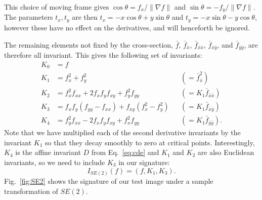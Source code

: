 \documentclass[review,onefignum,onetabnum]{siamonline190516}
\begin{document}
This choice of moving frame gives $\cos\theta = f_x/\lVert\nabla f\rVert$
and $\sin\theta = -f_y/\lVert \nabla f \rVert$. The parameters $t_x, t_y$
are then $t_x = -x\cos\theta + y\sin\theta$ and $t_y = -x\sin\theta -
y\cos\theta$, however these have no effect on the derivatives, and will
henceforth be ignored.

The remaining elements not fixed by the cross-section, $\bar{f}$,
$\bar{f}_{\bar{x}}$, $\bar{f}_{\bar{x}\bar{x}}$,
$\bar{f}_{\bar{x}\bar{y}}$, and $\bar{f}_{\bar{y}\bar{y}}$, are therefore
all invariant. This gives the following set of invariants:
\begin{equation}\label{eq:se2invariants}
\begin{aligned}
  K_0 &= f \\
  K_1 &= f_x^2 + f_y^2 & &(= \bar{f}_{\bar{x}}^2)\\
  K_2 &= f_x^2 f_{xx} + 2 f_x f_y f_{xy} + f_y^2 f_{yy} &&(= K_1\bar{f}_{\bar{x}\bar{x}}) \\
  K_3 &= f_x f_y (f_{yy} - f_{xx}) + f_{xy} (f_x^2 - f_y^2) &&(= K_1\bar{f}_{\bar{x}\bar{y}})\\
  K_4 &= f_y^2 f_{xx} - 2 f_x f_y f_{xy} + f_x^2 f_{yy} &&(= K_1\bar{f}_{\bar{y}\bar{y}}).
\end{aligned}
\end{equation}
Note that we have multiplied each of the second derivative invariants by the
invariant $K_1$ so that they decay smoothly to zero at critical
points.  Interestingly, $K_4$ is the affine invariant $D$ from
Eq.~\eqref{eq:cde} and $K_1$ and $K_2$ are also Euclidean invariants, so we need to
include $K_3$ in our signature: 
\begin{equation}
    \label{eq:SE2signature}
    I_{SE(2)}(f) = (f, K_1, K_3).
\end{equation}
Fig.~\ref{fig:SE2} shows the signature of our test image under a sample
transformation of $SE(2)$.
\end{document}
